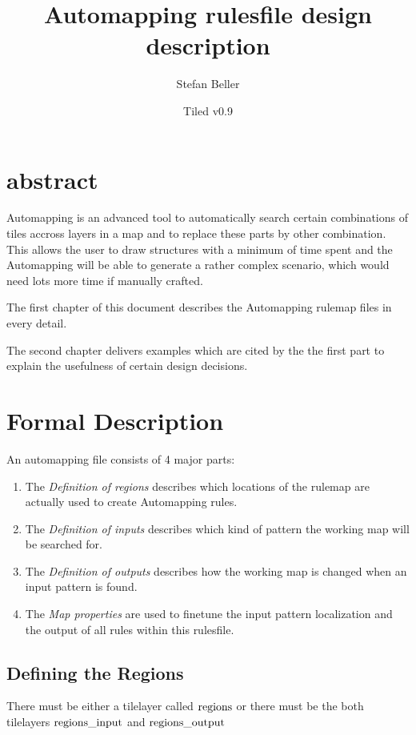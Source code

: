 \documentclass[dvips, a4paper, 12pt,listof=totoc, oneside, parskip]{scrbook}
\title{Automapping rulesfile design description}
\date{Tiled v0.9}
\author{Stefan Beller}
\begin{document}
\maketitle

\chapter*{abstract}
Automapping is an advanced tool to automatically search certain
combinations of tiles accross layers in a map and to replace
these parts by other combination. This allows the user to draw
structures with a minimum of time spent and the Automapping will be able
to generate a rather complex scenario, which would need lots more time if
manually crafted.

The first chapter of this document describes the Automapping rulemap
files in every detail.

The second chapter delivers examples which are cited by the the first part to
explain the usefulness of certain design decisions.


\chapter{Formal Description}
An automapping file consists of 4 major parts:

\begin{enumerate}
  \item The \emph{Definition of regions} describes which locations of the rulemap
  are actually used to create Automapping rules.

  \item The \emph{Definition of inputs} describes which kind of pattern the working map
  will be searched for.

  \item The \emph{Definition of outputs} describes how the working map is changed when
  an input pattern is found.

  \item The \emph{Map properties} are used to finetune the input pattern localization and the output of all rules within this rulesfile.
\end{enumerate}



\section{Defining the Regions}
There must be either a tilelayer called $\textup{regions}$ or there must be
the both tilelayers $\textup{regions}\_\textup{input}$ and
$\textup{regions}\_\textup{output}$
\end{document}
